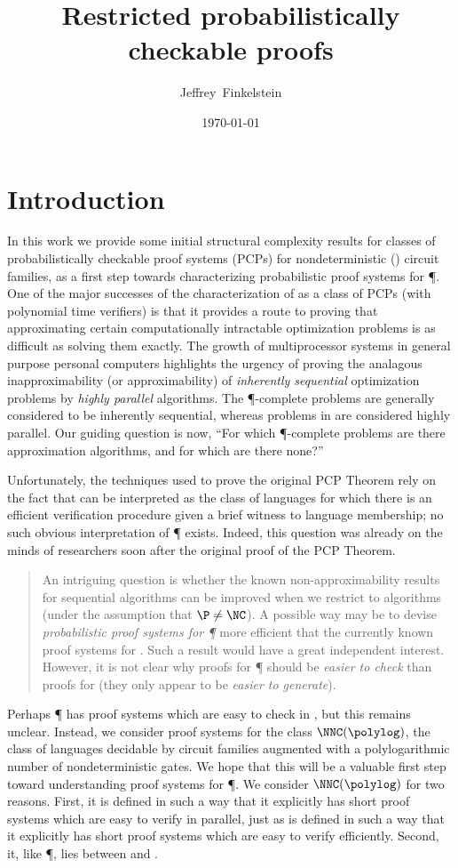 \documentclass{article}
\title{Restricted probabilistically checkable proofs}
\author{Jef{}frey~Finkelstein}
\date{\today}
\begin{document}
\maketitle

\section{Introduction}

In this work we provide some initial structural complexity results for classes of probabilistically checkable proof systems (PCPs) for nondeterministic \NC{} (\NNC) circuit families, as a first step towards characterizing probabilistic proof systems for \P.
One of the major successes of the characterization of \NP{} as a class of PCPs (with polynomial time verifiers) is that it provides a route to proving that approximating certain computationally intractable optimization problems is as difficult as solving them exactly.
The growth of multiprocessor systems in general purpose personal computers highlights the urgency of proving the analagous inapproximability (or approximability) of \emph{inherently sequential} optimization problems by \emph{highly parallel} algorithms.
The \P-complete problems are generally considered to be inherently sequential, whereas problems in \NC{} are considered highly parallel.
Our guiding question is now, ``For which \P-complete problems are there \NC{} approximation algorithms, and for which are there none?''

Unfortunately, the techniques used to prove the original PCP Theorem rely on the fact that \NP{} can be interpreted as the class of languages for which there is an efficient verification procedure given a brief witness to language membership; no such obvious interpretation of \P{} exists.
Indeed, this question was already on the minds of researchers soon after the original proof of the PCP Theorem.
\begin{quote}
  An intriguing question is whether the known non-approximability results for sequential algorithms can be improved when we restrict to \NC{} algorithms (under the assumption that $\P \neq \NC$).
  A possible way may be to devise \emph{probabilistic proof systems for \P} more efficient that the currently known proof systems for \NP.
  Such a result would have a great independent interest.
  However, it is not clear why proofs for \P{} should be \emph{easier to check} than proofs for \NP{} (they only appear to be \emph{easier to generate}). \cite{trevisan98}
\end{quote}
Perhaps \P{} has proof systems which are easy to check in \NC, but this remains unclear.
Instead, we consider proof systems for the class $\NNC(\polylog)$, the class of languages decidable by \NC{} circuit families augmented with a polylogarithmic number of nondeterministic gates.
We hope that this will be a valuable first step toward understanding proof systems for \P.
We consider $\NNC(\polylog)$ for two reasons.
First, it is defined in such a way that it explicitly has short proof systems which are easy to verify in parallel, just as \NP{} is defined in such a way that it explicitly has short proof systems which are easy to verify efficiently.
Second, it, like \P, lies between \NC{} and \NP{}.
\end{document}

